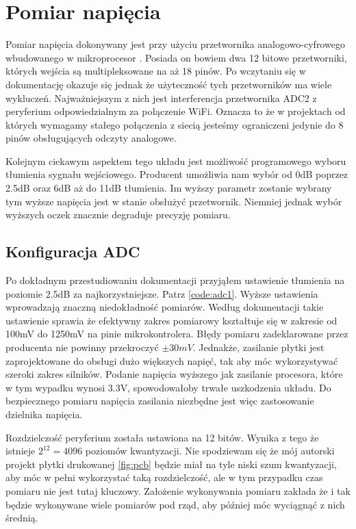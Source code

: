     \section{Pomiar napięcia}
         Pomiar napięcia dokonywany jest przy użyciu przetwornika analogowo-cyfrowego wbudowanego w mikroprocesor \cite{esp32}. Posiada on bowiem dwa 12 bitowe przetworniki, których wejścia są multipleksowane na aż 18 pinów. Po wczytaniu się w dokumentację okazuje się jednak że użyteczność tych przetworników ma wiele wykluczeń. Najważniejszym z nich jest interferencja przetwornika ADC2 z peryferium odpowiedzialnym za połączenie WiFi. Oznacza to że w projektach od których wymagamy stałego połączenia z siecią jesteśmy ograniczeni jedynie do 8 pinów obsługujących odczyty analogowe. 
         
         Kolejnym ciekawym aspektem tego układu jest możliwość programowego wyboru tłumienia sygnału wejściowego. Producent umożliwia nam wybór od 0dB poprzez 2.5dB oraz 6dB aż do 11dB tłumienia. Im wyższy parametr zostanie wybrany tym wyższe napięcia jest w stanie obsłużyć przetwornik. Niemniej jednak wybór wyższych oczek znacznie degraduje precyzję pomiaru.
     
     
    \subsection{Konfiguracja ADC}
        Po dokładnym przestudiowaniu dokumentacji przyjąłem ustawienie tłumienia na poziomie 2.5dB za najkorzystniejsze. Patrz \ref{code:adc1}. Wyższe ustawienia wprowadzają znaczną niedokładność pomiarów. Według dokumentacji \cite{esp32} takie ustawienie sprawia że efektywny zakres pomiarowy kształtuje się w zakresie od 100mV do 1250mV na pinie mikrokontrolera. Błędy pomiaru zadeklarowane przez producenta nie powinny przekroczyć $ \pm 30 mV$. Jednakże, zasilanie płytki jest zaprojektowane do obsługi dużo większych napięć, tak aby móc wykorzystywać szeroki zakres silników. Podanie napięcia wyższego jak zasilanie procesora, które w tym wypadku wynosi 3.3V, spowodowałoby trwałe uszkodzenia układu. Do bezpiecznego pomiaru napięcia zasilania niezbędne jest więc zastosowanie dzielnika napięcia. 
        
        Rozdzielczość peryferium została ustawiona na 12 bitów. Wynika z tego że istnieje $2^{12} = 4096$ poziomów kwantyzacji. Nie spodziewam się że mój autorski projekt płytki drukowanej \ref{fig:pcb} będzie miał na tyle niski szum kwantyzacji, aby móc w pełni wykorzystać taką rozdzielczość, ale w tym przypadku czas pomiaru nie jest tutaj kluczowy. Założenie wykonywania pomiaru zakłada że i tak będzie wykonywane wiele pomiarów pod rząd, aby później móc wyciągnąć z nich średnią.
        
